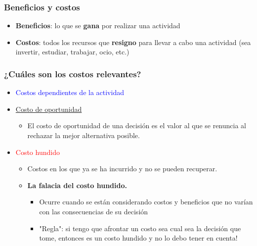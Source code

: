 \documentclass{beamer}
\begin{document}
\begin{frame}
\frametitle{Beneficios y costos}
\begin{itemize}
    \item \textbf{Beneficios}: lo que se \textbf{gana} por realizar una actividad \vspace{2mm}
    \item \textbf{Costos}: todos los recursos que \textbf{resigno} para llevar a cabo una actividad (sea invertir, estudiar, trabajar, ocio, etc.) \vspace{2mm}
\end{itemize} 
\end{frame}

\begin{frame}
\frametitle{¿Cuáles son los costos relevantes? }
\begin{itemize}
    \item \textcolor{blue}{Costos dependientes de la actividad} \vspace{2mm}
    \item  \href{https://econ.video/2017/08/28/the-simpsons-opportunity-cost-of-lines/}{Costo de oportunidad}
    \begin{itemize}
    \vspace{2mm}
        \item  El costo de oportunidad de una decisión es el valor al que se renuncia al rechazar la mejor alternativa posible.
    \end{itemize}
    \vspace{2mm}
    \item \textcolor{red}{Costo hundido}
    \begin{itemize}
    \vspace{2mm}
    \item Costos en los que ya se ha incurrido y no se pueden recuperar.
    \end{itemize}
    \vspace{2mm}
    \begin{itemize}
    \item \textbf{La falacia del costo hundido.}  
        \begin{itemize}
        \item Ocurre cuando se están considerando costos y beneficios que no varían con las consecuencias de su decisión
        \item  "Regla": si tengo que afrontar un costo sea cual sea la decisión que tome, entonces es un costo hundido y no lo debo tener en cuenta!
        \end{itemize}
    \end{itemize}
    \vspace{2mm}
\end{itemize} 
\end{frame}
\end{document}
